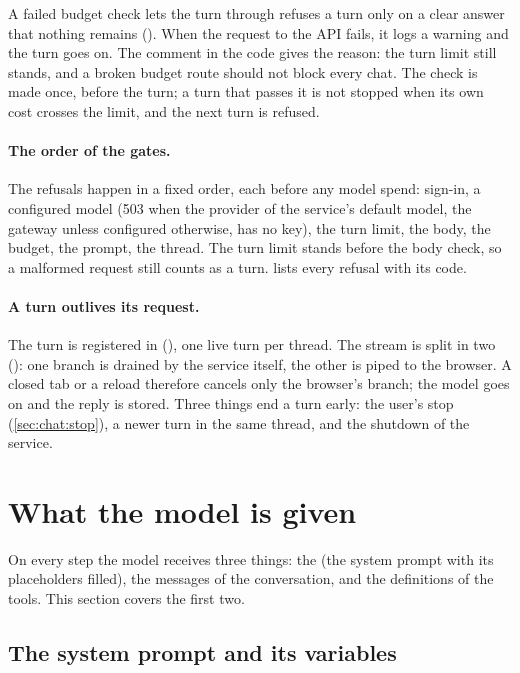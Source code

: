 \begin{codebox}{A failed budget check lets the turn through}
 refuses a turn only on a clear answer that nothing remains
(). When the request to the API fails, it logs a warning and the turn goes
on. The comment in the code gives the reason: the turn limit still stands, and a broken budget
route should not block every chat. The check is made once, before the turn; a turn that
passes it is not stopped when its own cost crosses the limit, and the next turn is refused.
\end{codebox}

\paragraph{The order of the gates.} The refusals happen in a fixed order, each before any
model spend: sign-in, a configured model (503  when the provider of the
service's default model, the gateway unless configured otherwise, has no key), the turn limit, the body, the budget, the prompt, the thread. The turn limit
stands before the body check, so a malformed request still counts as a turn.
 lists every refusal with its code.

\paragraph{A turn outlives its request.} The turn is registered in 
(), one live turn per thread. The stream is split in two (): one
branch is drained by the service itself, the other is piped to the browser. A closed tab or a
reload therefore cancels only the browser's branch; the model goes on and the reply is stored.
Three things end a turn early: the user's stop (\cref{sec:chat:stop}), a newer turn in the same
thread, and the shutdown of the service.


\section{What the model is given}\label{sec:chat:given}

On every step the model receives three things: the  (the system prompt with
its placeholders filled), the messages of the conversation, and the definitions of the tools.
This section covers the first two.

\subsection{The system prompt and its variables}\label{sec:chat:variables}

